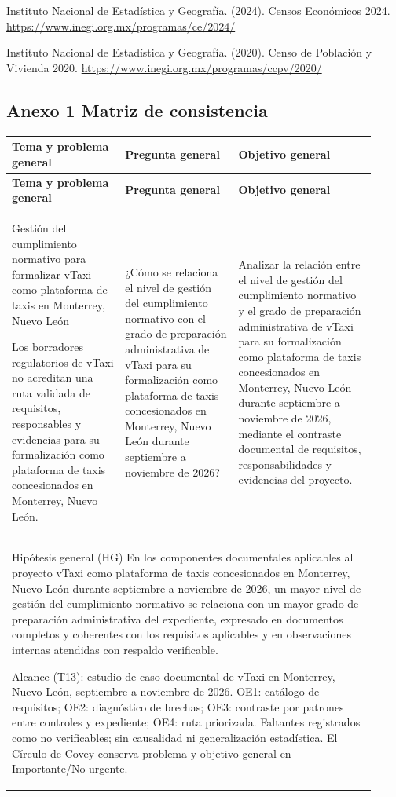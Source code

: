 {Instituto Nacional de Estadística y Geografía. (2024). Censos Económicos 2024. \url{https://www.inegi.org.mx/programas/ce/2024/}


Instituto Nacional de Estadística y Geografía. (2020). Censo de Población y Vivienda 2020. \url{https://www.inegi.org.mx/programas/ccpv/2020/}


\clearpage\pagestyle{empty}\begin{landscape}
\section*{Anexo 1 Matriz de consistencia}
\begingroup\small{}
\begin{longtable}{@{}p{0.29\linewidth}p{0.29\linewidth}p{0.34\linewidth}@{}}
\toprule
\textbf{Tema y problema general} & \textbf{Pregunta general} & \textbf{Objetivo general}\\
\midrule\endfirsthead
\toprule
\textbf{Tema y problema general} & \textbf{Pregunta general} & \textbf{Objetivo general}\\
\midrule\endhead
Gestión del cumplimiento normativo para formalizar vTaxi como plataforma de taxis en Monterrey, Nuevo León

Los borradores regulatorios de vTaxi no acreditan una ruta validada de requisitos, responsables y evidencias para su formalización como plataforma de taxis concesionados en Monterrey, Nuevo León. & ¿Cómo se relaciona el nivel de gestión del cumplimiento normativo con el grado de preparación administrativa de vTaxi para su formalización como plataforma de taxis concesionados en Monterrey, Nuevo León durante septiembre a noviembre de 2026? & Analizar la relación entre el nivel de gestión del cumplimiento normativo y el grado de preparación administrativa de vTaxi para su formalización como plataforma de taxis concesionados en Monterrey, Nuevo León durante septiembre a noviembre de 2026, mediante el contraste documental de requisitos, responsabilidades y evidencias del proyecto.\\
\midrule
\multicolumn{3}{p{0.92\linewidth}}{Hipótesis general (HG)
En los componentes documentales aplicables al proyecto vTaxi como plataforma de taxis concesionados en Monterrey, Nuevo León durante septiembre a noviembre de 2026, un mayor nivel de gestión del cumplimiento normativo se relaciona con un mayor grado de preparación administrativa del expediente, expresado en documentos completos y coherentes con los requisitos aplicables y en observaciones internas atendidas con respaldo verificable.\par Alcance (T13): estudio de caso documental de vTaxi en Monterrey, Nuevo León, septiembre a noviembre de 2026. OE1: catálogo de requisitos; OE2: diagnóstico de brechas; OE3: contraste por patrones entre controles y expediente; OE4: ruta priorizada. Faltantes registrados como no verificables; sin causalidad ni generalización estadística. El Círculo de Covey conserva problema y objetivo general en Importante/No urgente.}\\
\bottomrule\end{longtable}
\endgroup

\end{landscape}}
